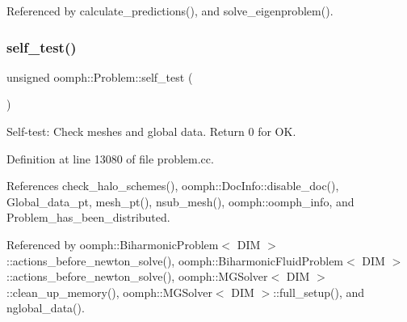 Referenced by calculate\+\_\+predictions(), and solve\+\_\+eigenproblem().

\mbox{\label{classoomph_1_1Problem_acdb76c0b94aa3cc5470ce862d70a8017}} 
\subsubsection{\texorpdfstring{self\+\_\+test()}{self\_test()}}
{\footnotesize\ttfamily unsigned oomph\+::\+Problem\+::self\+\_\+test (\begin{DoxyParamCaption}{ }\end{DoxyParamCaption})}



Self-\/test\+: Check meshes and global data. Return 0 for OK. 



Definition at line 13080 of file problem.\+cc.



References check\+\_\+halo\+\_\+schemes(), oomph\+::\+Doc\+Info\+::disable\+\_\+doc(), Global\+\_\+data\+\_\+pt, mesh\+\_\+pt(), nsub\+\_\+mesh(), oomph\+::oomph\+\_\+info, and Problem\+\_\+has\+\_\+been\+\_\+distributed.



Referenced by oomph\+::\+Biharmonic\+Problem$<$ D\+I\+M $>$\+::actions\+\_\+before\+\_\+newton\+\_\+solve(), oomph\+::\+Biharmonic\+Fluid\+Problem$<$ D\+I\+M $>$\+::actions\+\_\+before\+\_\+newton\+\_\+solve(), oomph\+::\+M\+G\+Solver$<$ D\+I\+M $>$\+::clean\+\_\+up\+\_\+memory(), oomph\+::\+M\+G\+Solver$<$ D\+I\+M $>$\+::full\+\_\+setup(), and nglobal\+\_\+data().

\mbox{\label{classoomph_1_1Problem_a3e07d0acd3499ac7736fba1841ad1cf2}} 
